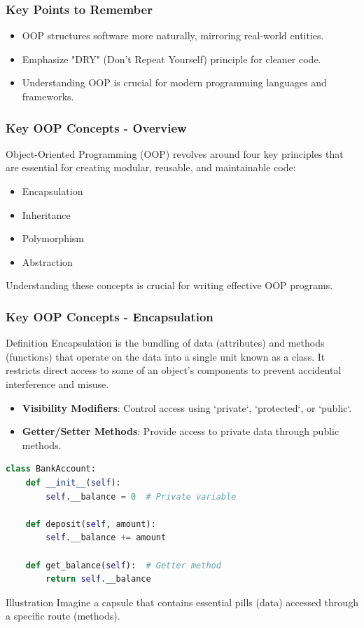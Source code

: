 \documentclass{beamer}
\begin{document}
\begin{frame}[fragile]
    \frametitle{Key Points to Remember}
    \begin{itemize}
        \item OOP structures software more naturally, mirroring real-world entities.
        \item Emphasize "DRY" (Don't Repeat Yourself) principle for cleaner code.
        \item Understanding OOP is crucial for modern programming languages and frameworks.
    \end{itemize}
\end{frame}

\begin{frame}[fragile]
    \frametitle{Key OOP Concepts - Overview}
    Object-Oriented Programming (OOP) revolves around four key principles that are essential for creating modular, reusable, and maintainable code:
    \begin{itemize}
        \item Encapsulation
        \item Inheritance
        \item Polymorphism
        \item Abstraction
    \end{itemize}
    Understanding these concepts is crucial for writing effective OOP programs.
\end{frame}

\begin{frame}[fragile]
    \frametitle{Key OOP Concepts - Encapsulation}
    \begin{block}{Definition}
        Encapsulation is the bundling of data (attributes) and methods (functions) that operate on the data into a single unit known as a class. 
        It restricts direct access to some of an object's components to prevent accidental interference and misuse.
    \end{block}

    \begin{itemize}
        \item \textbf{Visibility Modifiers}: Control access using `private`, `protected`, or `public`.
        \item \textbf{Getter/Setter Methods}: Provide access to private data through public methods.
    \end{itemize}

    \begin{lstlisting}[language=Python]
class BankAccount:
    def __init__(self):
        self.__balance = 0  # Private variable

    def deposit(self, amount):
        self.__balance += amount

    def get_balance(self):  # Getter method
        return self.__balance
    \end{lstlisting}
    
    \begin{block}{Illustration}
        Imagine a capsule that contains essential pills (data) accessed through a specific route (methods).
    \end{block}
\end{frame}
\end{document}
